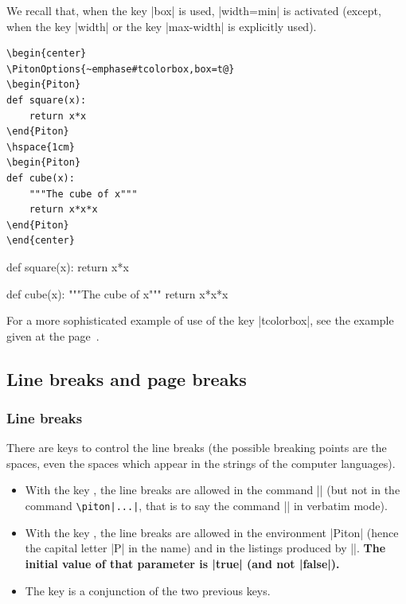 \documentclass{article}
\begin{document}
We recall that, when the key |box| is used, |width=min| is activated (except,
when the key |width| or the key |max-width| is explicitly used).


\smallskip
\begin{Verbatim}
\begin{center}
\PitonOptions{~emphase#tcolorbox,box=t@}
\begin{Piton}
def square(x):
    return x*x
\end{Piton}
\hspace{1cm}
\begin{Piton}
def cube(x):
    """The cube of x"""
    return x*x*x
\end{Piton}
\end{center}
\end{Verbatim}

\begin{center}
%
\begin{Piton}
def square(x):
    return x*x
\end{Piton}
\hspace{1cm}
\begin{Piton}
def cube(x):
    """The cube of x"""
    return x*x*x
\end{Piton}
\end{center}



\bigskip
For a more sophisticated example of use of the key |tcolorbox|, see the example
given at the page~\pageref{examples-tcolorbox}.



\bigskip
\subsection{Line breaks and page breaks}

\label{breakable}

\subsubsection{Line breaks}

\label{line-breaks}

There are keys to control the line breaks (the possible breaking points are
the spaces, even the spaces which appear in the strings of the computer
languages).
\begin{itemize}
\item {} With the key
, the line breaks are allowed in the command
|| (but not in the command \verb+\piton|...|+, that is to say the
command |\piton| in verbatim mode).
\item {} With the key
, the line breaks are allowed in the
environment |{Piton}| (hence the capital letter |P| in the name) and in the
listings produced by |\PitonInputFile|. {\bfseries The initial value of that parameter is
|true| (and not |false|).}
\item {} The key  is a conjunction of
the two previous keys. 
\end{itemize}
\end{document}
